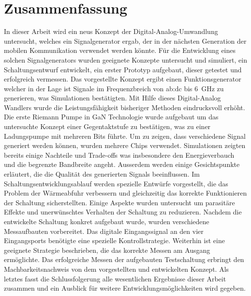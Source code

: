 \newpage
\chapter*{Zusammenfassung}

In dieser Arbeit wird ein neus Konzept der Digital-Analog-Umwandlung untersucht, welches ein Signalgenerator ergab, der in der n\"achsten Generation der mobilen Kommunikation verwendet werden k\"onnte.
F\"ur die Entwicklung eines solchen Signalgenerators wurden geeignete Konzepte untersucht und simuliert, ein Schaltungsentwurf entwickelt, ein erster Prototyp aufgebaut, dieser getestet und erfolgreich vermessen.
Das vorgestellte Konzept ergibt einen Funktionsgenerator welcher in der Lage ist Signale im Frequenzbreich von \gls{ab:dc} bis \SI{6}{\giga \hertz} zu generieren, was Simulationen best\"atigten.
Mit Hilfe dieses Digital-Analog Wandlers wurde die Leistungsf\"ahigkeit bisheriger Methoden eindrucksvoll erh\"oht.
Die erste Riemann Pumpe in GaN Technologie wurde aufgebaut um das untersuchte Konzept einer Gegentaktstufe zu best\"atigen, was zu einer Ladungspumpe mit mehreren Bits f\"uhrte.
Um zu zeigen, dass verschiedene Signal generiert werden k\"onnen, wurden mehrere Chips verwendet.
Simulationen zeigten bereits einige Nachteile und Trade-offs was insbesondere den Energieverbauch und die begrenzte Bandbreite angeht.
Ausserdem werden einige Gesichtspunkte erl\"autert, die die Qualit\"at des generierten Signals beeinflussen.
Im Schaltungsentwicklungsablauf werden spezielle Entw\"urfe vorgestellt, die das Problem der W\"armeabfuhr verbessern und gleichzeitig das korrekte Funktionieren der Schaltung sicherstellten.
Einige Aspekte wurden untersucht um parasit\"are Effekte und unerw\"unschtes Verhalten der Schaltung zu reduzieren.
Nachdem die entwickelte Schaltung konkret aufgebaut wurde, wurden verschiedene Messaufbauten vorbereitet.
Das digitale Eingangssignal an den vier Eingangsports ben\"otigte eine spezielle Kontrollstrategie.
Weiterhin ist eine geeignete Strategie beschrieben, die das korrekte Messen am Ausgang erm\"oglichte.
Das erfolgreiche Messen der aufgebauten Testschaltung erbringt den Machbarkeitsnachweis von dem vorgestellten und entwickelten Konzept.
Als letztes fasst die Schlussfolgerung alle wesentlichen Ergebnisse dieser Arbeit zusammen und ein Ausblick f\"ur weitere Entwicklungsm\"oglichkeiten wird gegeben.
